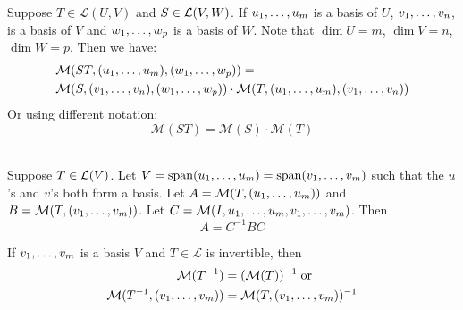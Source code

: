   \begin{thm} 
    Suppose $T\in \mathcal{L}(U,V)$ and $S\in {\mathcal{L}(V,W)}$. If $u_1, \dots, u_m$ is a basis of $U$, $v_1, \dots, v_n$, is a basis of $V$ and $w_1, \dots, w_{p}$ is a basis of $W$. Note that $\dim U = m$, $\dim V = n$, $\dim W = p$. Then we have:
    \begin{equation}
    \begin{aligned}
      &\mathcal{M}(ST, (u_1, \dots, u_m), (w_1, \dots, w_{p})) = \\
      &\mathcal{M}(S, (v_1, \dots, v_n), (w_1, \dots, w_{p} ))
      \cdot
      \mathcal{M}(T, (u_1, \dots, u_m), (v_1, \dots, v_n   ))
    \end{aligned}
    \end{equation}
    Or using different notation:
    \begin{equation}
      \mathcal{M}(ST) = \mathcal{M}(S) \cdot \mathcal{M}(T)
    \end{equation}
  \end{thm}

  \setcounter{thm}{83}
  \begin{thm}
    \\
    Suppose $T \in \mathcal{L}(V)$. Let
    $V = \operatorname{span} (u_1, \dots, u_m) = \operatorname{span} (v_1, \dots, v_m)$ such that the $u$'s and $v$'s both form a basis. Let $A=\mathcal{M}(T, (u_1, \dots, u_m))$ and $B=\mathcal{M}(T,(v_1, \dots, v_m))$. Let
    $C=\mathcal{M}(I, u_1, \dots, u_m, v_1, \dots, v_m)$. Then
    \begin{equation}
    A = C^{-1} B C
    \end{equation}
  \end{thm}

  \setcounter{thm}{85}
  \begin{thm}
    If $v_1, \dots, v_m$ is a basis $V$ and $T\in \mathcal{L}$ is invertible, then
    \begin{equation}
      \begin{aligned}
        \mathcal{M}(T^{-1}) & = (\mathcal{M}(T))^{-1} \; \text{or} \\
        \mathcal{M}(T^{-1}, (v_1, \dots, v_m)) & =\mathcal{M}(T, (v_1, \dots, v_m))^{-1}
      \end{aligned}
    \end{equation}
  \end{thm}